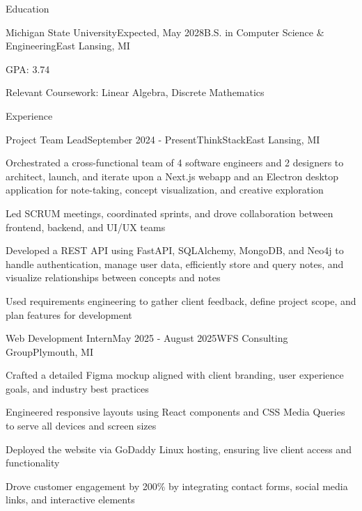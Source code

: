 \documentclass[
	11pt
]{resume}
\begin{document}
	\begin{rSection}{E}{ducation}
		\begin{rSectionEntry}{Michigan State University}{Expected, May 2028}{B.S. in Computer Science \& Engineering}{East Lansing, MI}
			\item GPA: 3.74
			\item Relevant Coursework: Linear Algebra, Discrete Mathematics
		\end{rSectionEntry}
	\end{rSection}

	\begin{rSection}{E}{xperience}
		\begin{rSectionEntry}{Project Team Lead}{September 2024 - Present}{ThinkStack}{East Lansing, MI}
			\item Orchestrated a cross-functional team of 4 software engineers and 2 designers to architect, launch, and iterate upon a Next.js webapp and an Electron desktop application for note-taking, concept visualization, and creative exploration
			\item Led SCRUM meetings, coordinated sprints, and drove collaboration between frontend, backend, and UI/UX teams
			\item Developed a REST API using FastAPI, SQLAlchemy, MongoDB, and Neo4j to handle authentication, manage user data, efficiently store and query notes, and visualize relationships between concepts and notes
			\item Used requirements engineering to gather client feedback, define project scope, and plan features for development
		\end{rSectionEntry}

		\begin{rSectionEntry}{Web Development Intern}{May 2025 - August 2025}{WFS Consulting Group}{Plymouth, MI}
			\item Crafted a detailed Figma mockup aligned with client branding, user experience goals, and industry best practices
			\item Engineered responsive layouts using React components and CSS Media Queries to serve all devices and screen sizes
			\item Deployed the website via GoDaddy Linux hosting, ensuring live client access and functionality
			\item Drove customer engagement by 200\% by integrating contact forms, social media links, and interactive elements
		\end{rSectionEntry}
	\end{rSection}
\end{document}
